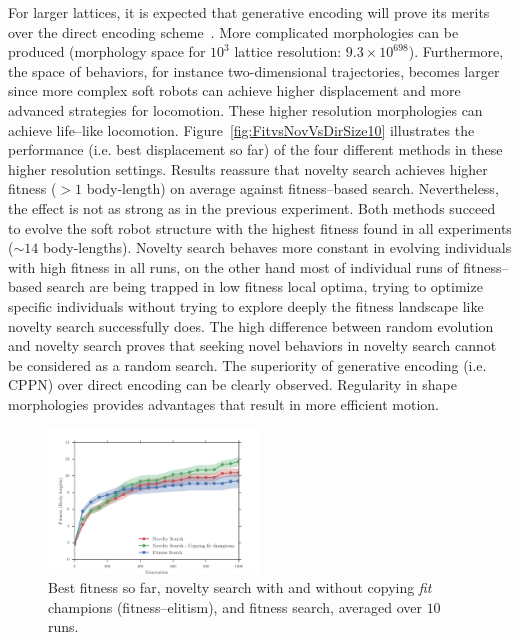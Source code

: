 \documentclass{sig-alternate}
\begin{document}
For larger lattices, it is expected that generative encoding will prove its merits over the direct encoding scheme~\cite{cheney2013unshackling,stanley2007compositional}. More complicated morphologies can be produced (morphology space for $10^3$ lattice resolution: $9.3 \times 10^{698}$). Furthermore, the space of behaviors, for instance two-dimensional trajectories, becomes larger since more complex soft robots can achieve higher displacement and more advanced strategies for locomotion. These higher resolution morphologies can achieve life--like locomotion. Figure~\ref{fig:FitvsNovVsDirSize10} illustrates the performance (i.e. best displacement so far) of the four different methods in these higher resolution settings. Results reassure that novelty search achieves higher fitness ($> 1$ body-length) on average against fitness--based search. Nevertheless, the effect is not as strong as in the previous experiment. Both methods succeed to evolve the soft robot structure with the highest fitness found in all experiments ($\sim 14$ body-lengths). Novelty search behaves more constant in evolving individuals with high fitness in all runs, on the other hand most of individual runs of fitness--based search are being trapped in low fitness local optima, trying to optimize specific individuals without trying to explore deeply the fitness landscape like novelty search successfully does. The high difference between random evolution and novelty search proves that seeking novel behaviors in novelty search cannot be considered as a random search. The superiority of generative encoding (i.e. CPPN) over direct encoding can be clearly observed. Regularity in shape morphologies provides advantages that result in more efficient motion.

\begin{figure}[t!]
\centering
\includegraphics[width=0.5\textwidth]{../Figures/Results/CopyFitChampions10.pdf}
\caption{Best fitness so far, novelty search with and without copying \emph{fit} champions (fitness--elitism), and fitness search, averaged over $10$ runs.}
\label{fig:CopyFitChampions10}
\end{figure}
\end{document}
